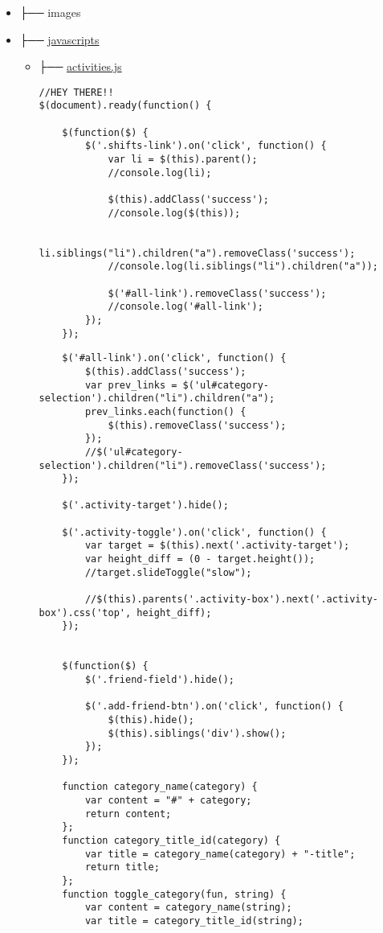 \documentclass[11pt]{article}
\begin{document}
\begin{itemize}
\item ├── images
\label{sec-1-1-1-1}
\item ├── \href{./app/assets/javascripts}{javascripts}
\label{sec-1-1-1-2}
\begin{itemize}
\item ├── \href{./app/assets/javascripts/activities.js}{activities.js}
\label{sec-1-1-1-2-1}

\begin{verbatim}
//HEY THERE!!
$(document).ready(function() {

    $(function($) {
        $('.shifts-link').on('click', function() {
            var li = $(this).parent();
            //console.log(li);

            $(this).addClass('success');
            //console.log($(this));

            li.siblings("li").children("a").removeClass('success');
            //console.log(li.siblings("li").children("a"));

            $('#all-link').removeClass('success');
            //console.log('#all-link');
        });
    });
\end{verbatim}

\begin{verbatim}
    $('#all-link').on('click', function() {
        $(this).addClass('success');
        var prev_links = $('ul#category-selection').children("li").children("a");
        prev_links.each(function() {
            $(this).removeClass('success');
        });
        //$('ul#category-selection').children("li").removeClass('success');
    });

    $('.activity-target').hide();

    $('.activity-toggle').on('click', function() {
        var target = $(this).next('.activity-target');
        var height_diff = (0 - target.height());
        //target.slideToggle("slow");

        //$(this).parents('.activity-box').next('.activity-box').css('top', height_diff);
    });


    $(function($) {
        $('.friend-field').hide();

        $('.add-friend-btn').on('click', function() {
            $(this).hide();
            $(this).siblings('div').show();
        });
    });

    function category_name(category) {
        var content = "#" + category;
        return content;
    };
    function category_title_id(category) {
        var title = category_name(category) + "-title";
        return title;
    };
    function toggle_category(fun, string) {
        var content = category_name(string);
        var title = category_title_id(string);


\end{verbatim}
\end{itemize}
\end{itemize}
\end{document}

